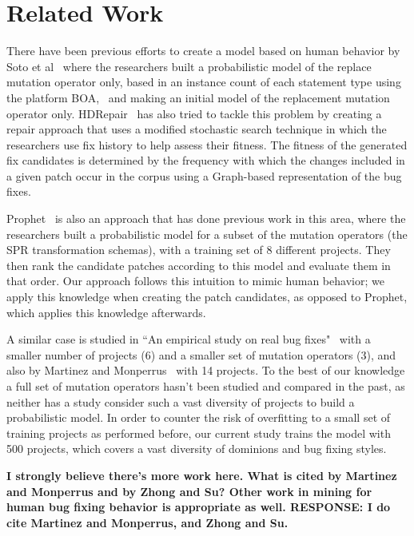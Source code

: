 \documentclass[conference]{IEEEtran}
\newcommand{\todo}[1]
  {{\scriptsize \textbf{\color{red} {#1}}}}
\begin{document}
\section{Related Work} \label{relatedWork}

There have been previous efforts to create a model based on human behavior by Soto et al~\cite{Soto15} 
where the researchers built a probabilistic model of the replace mutation 
operator only, based in 
an instance count of each statement type using the platform 
BOA,~\cite{dyer2013} and making an initial model of the replacement mutation 
operator only. HDRepair~\cite{xuan16} has also tried to tackle this problem by 
creating a repair approach that uses a modified stochastic search
technique in which the researchers use fix history
to help assess their fitness. The fitness of the generated
fix candidates is determined by the frequency with which the changes included in a given patch occur in the corpus using a Graph-based representation of the bug fixes.

Prophet~\cite{long15} is also an approach that has done previous work in this 
area, where the researchers built a 
probabilistic model for a subset of the mutation operators (the SPR transformation schemas), with a training set 
of 8 different projects. They then rank the candidate patches according to this model and evaluate them in that order. Our approach follows this intuition to mimic human behavior; we apply this knowledge when creating the patch candidates, as opposed to Prophet, which applies this knowledge afterwards. 

A similar case is studied in ``An empirical study on 
real bug fixes"~\cite{zhong15} with a smaller number of projects (6) and a 
smaller set of 
mutation operators (3), and also by Martinez and Monperrus~\cite{martinez15} with 14 
projects. To the best of our knowledge a full set of mutation 
operators hasn't been studied and compared in the past, as neither has a study 
consider such a vast diversity of projects to build a probabilistic model. In 
order to counter the 
risk of overfitting to a small set of training projects as performed before, our 
current study trains the model with 500 projects, which covers a vast diversity 
of dominions and bug fixing styles.

\todo{I strongly believe there's more work here.  What is cited by Martinez and
  Monperrus and by Zhong and Su?  Other work in mining for human bug fixing
  behavior is appropriate as well. RESPONSE: I do cite Martinez and Monperrus, and Zhong and Su.}
\end{document}
